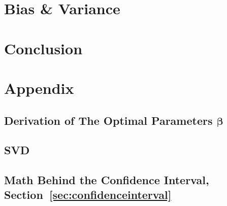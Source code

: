 \documentclass[twoside,11pt]{report}
\begin{document}
\section{Bias \& Variance}
\label{sec:biasvariance}









\section{Conclusion}
\label{sec:conclusion}


























%
%
\newpage
\appendix
{}%
\section*{Appendix}
\label{app:appendix}




%
\subsection*{Derivation of The Optimal Parameters $\boldsymbol{\beta}$}
\label{app:OptimalBeta}







%
\subsection*{SVD}
\label{app:svd}





%
\subsection*{Math Behind the Confidence Interval, Section~\ref{sec:confidenceinterval}}
\label{app:confidenceinterval}




\vskip 0.2in

% 

%
\end{document}
